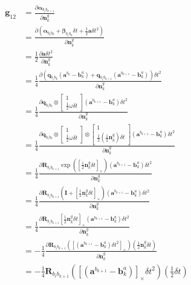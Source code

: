 \documentclass[12pt,a4paper,utf8]{article}
\begin{document}
\begin{landscape}
\begin{multicols}{2}
$$
\begin{aligned} 
\mathbf{g}_{12} 
&=
\frac{\partial \boldsymbol{\alpha}_{b_{i} b_{k+1}}}{\partial \mathbf{n}_{k}^{g}} \\
&=
\frac{\partial (\boldsymbol{\alpha}_{b_{i} b_{k}}+\boldsymbol{\beta}_{b_{i} b_{k}} \delta t+\frac{1}{2} \mathbf{a} \delta t^{2})}{\partial \mathbf{n}_{k}^{g}} \\ 
&=
\frac{1}{2} \frac{\partial \mathbf{a} \delta t^{2}}{\partial \mathbf{n}_{k}^{g}} \\
&=
\frac{1}{4} \frac{\partial 
	\left(\mathbf{q}_{b_{i} b_{k}}\left(\mathbf{a}^{b_{k}}-\mathbf{b}_{k}^{a}\right)+\mathbf{q}_{b_{i} b_{k+1}}\left(\mathbf{a}^{b_{k+1}}-\mathbf{b}_{k}^{a}\right)\right)\delta t^{2}}
{\partial \mathbf{n}_{k}^{g}} \\
&=
\frac{1}{4} \frac{\partial 
	\mathbf{q}_{b_{i} b_{k}} \otimes\left[\begin{array}{c}{1} \\ {\frac{1}{2} \omega \delta t}\end{array}\right] \left(\mathbf{a}^{b_{k+1}}-\mathbf{b}_{k}^{a}\right)\delta t^{2}}
{\partial \mathbf{n}_{k}^{g}} \\
&=
\frac{1}{4} \frac{\partial 
	\mathbf{q}_{b_{i} b_{k}} \otimes\left[\begin{array}{c}{1} \\ {\frac{1}{2} \omega \delta t}\end{array}\right] \otimes\left[\begin{array}{c}{1} \\ {\frac{1}{2} \left(\frac{1}{2} \mathbf{n}_{k}^{g} \right) \delta t}\end{array}\right] \left(\mathbf{a}^{b_{k+1}}-\mathbf{b}_{k}^{a}\right) \delta t^{2}}
{\partial \mathbf{n}_{k}^{g}} \\
&=
\frac{1}{4} \frac{\partial 
	\mathbf{R}_{b_{i} b_{k+1}} \exp \left(\left[\frac{1}{2} \mathbf{n}_{k}^{g} \delta t\right]_{ \times}\right)\left(\mathbf{a}^{b_{k+1}}-\mathbf{b}_{k}^{a}\right) \delta t^{2}}
{\partial \mathbf{n}_{k}^{g}} \\
&=
\frac{1}{4} \frac{\partial 
	\mathbf{R}_{b_{i} b_{k+1}}\left(\mathbf{I}+\left[\frac{1}{2} \mathbf{n}_{k}^{g} \delta t\right]_{ \times}\right)\left(\mathbf{a}^{b_{k+1}}-\mathbf{b}_{k}^{a}\right) \delta t^{2}}
{\partial \mathbf{n}_{k}^{g}} \\
&=
\frac{1}{4} \frac{\partial 
	\mathbf{R}_{b_{i} b_{k+1}}\left[\frac{1}{2} \mathbf{n}_{k}^{g} \delta t\right]_{ \times}\left(\mathbf{a}^{b_{k+1}}-\mathbf{b}_{k}^{a}\right) \delta t^{2}}
{\partial \mathbf{n}_{k}^{g}} \\
&=
-\frac{1}{4} \frac{\partial 
	\mathbf{R}_{b_{i} b_{k+1}}\left(\left[\left(\mathbf{a}^{b_{k+1}}-\mathbf{b}_{k}^{a}\right) \delta t^{2}\right]_{ \times}\right)\left(\frac{1}{2} \mathbf{n}_{k}^{g} \delta t\right)}
{\partial \mathbf{n}_{k}^{g}} \\
&=
-\frac{1}{4} 
\mathbf{R}_{b_{i} b_{k+1}}\left(\left[\left(\mathbf{a}^{b_{k+1}}-\mathbf{b}_{k}^{a}\right) \right]_{\times}\delta t^{2}\right)\left(\frac{1}{2} \delta t\right)
\end{aligned}
$$
\end{multicols}
\end{landscape}
\end{document}
